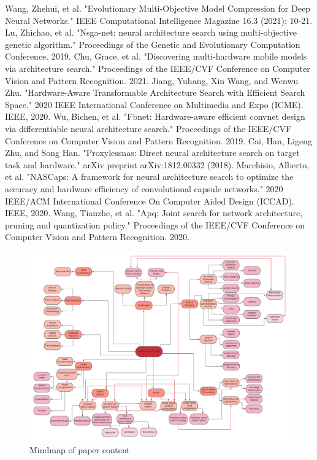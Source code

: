 \documentclass[conference]{IEEEtran}
\begin{document}
\begin{thebibliography}{00}
 Wang, Zhehui, et al. "Evolutionary Multi-Objective Model Compression for Deep Neural Networks." IEEE Computational Intelligence Magazine 16.3 (2021): 10-21.
 Lu, Zhichao, et al. "Nsga-net: neural architecture search using multi-objective genetic algorithm." Proceedings of the Genetic and Evolutionary Computation Conference. 2019.
 Chu, Grace, et al. "Discovering multi-hardware mobile models via architecture search." Proceedings of the IEEE/CVF Conference on Computer Vision and Pattern Recognition. 2021.
 Jiang, Yuhang, Xin Wang, and Wenwu Zhu. "Hardware-Aware Transformable Architecture Search with Efficient Search Space." 2020 IEEE International Conference on Multimedia and Expo (ICME). IEEE, 2020.
 Wu, Bichen, et al. "Fbnet: Hardware-aware efficient convnet design via differentiable neural architecture search." Proceedings of the IEEE/CVF Conference on Computer Vision and Pattern Recognition. 2019.
 Cai, Han, Ligeng Zhu, and Song Han. "Proxylessnas: Direct neural architecture search on target task and hardware." arXiv preprint arXiv:1812.00332 (2018).
 Marchisio, Alberto, et al. "NASCaps: A framework for neural architecture search to optimize the accuracy and hardware efficiency of convolutional capsule networks." 2020 IEEE/ACM International Conference On Computer Aided Design (ICCAD). IEEE, 2020.
 Wang, Tianzhe, et al. "Apq: Joint search for network architecture, pruning and quantization policy." Proceedings of the IEEE/CVF Conference on Computer Vision and Pattern Recognition. 2020.
\end{thebibliography}

\begin{figure}[htbp]
\includegraphics[width=\paperwidth, angle =90]{harware-awareNAS.png}
\caption{Mindmap of paper content}
\label{fig:Mindmap}
\end{figure} 
\end{document}
